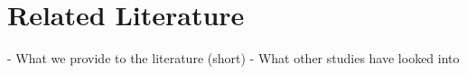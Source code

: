 \section{Related Literature} \label{sec:literature}
- What we provide to the literature (short) 
- What other studies have looked into